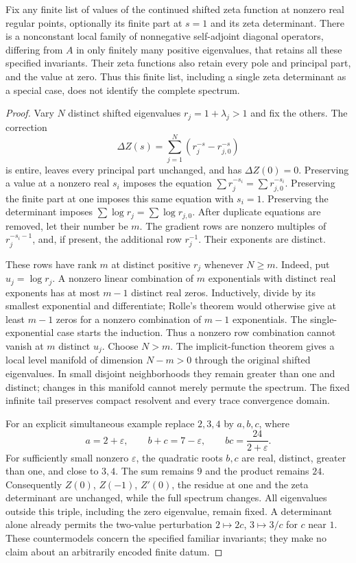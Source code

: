 \begin{theorem}
\label{final:O4-finite-countermodels}
Fix any finite list of values of the continued shifted zeta function
at nonzero real regular points, optionally its finite part at $s=1$
and its zeta determinant.  There is a nonconstant local family of
nonnegative self-adjoint diagonal operators, differing from $A$ in
only finitely many positive eigenvalues, that retains all these
specified invariants.  Their zeta functions also retain every pole
and principal part, and the value at zero.  Thus this finite list,
including a single zeta determinant as a special case, does not
identify the complete spectrum.
\end{theorem}

\begin{proof}
Vary $N$ distinct shifted eigenvalues $r_j=1+\lambda_j>1$ and fix
the others.  The correction
\[
 \Delta Z(s)=\sum_{j=1}^N(r_j^{-s}-r_{j,0}^{-s})
\]
is entire, leaves every principal part unchanged, and has
$\Delta Z(0)=0$.  Preserving a value at a nonzero real $s_i$ imposes
the equation $\sum r_j^{-s_i}=\sum r_{j,0}^{-s_i}$.
Preserving the finite part at one imposes this same equation with
$s_i=1$.  Preserving the determinant imposes
$\sum\log r_j=\sum\log r_{j,0}$.
After duplicate equations are removed, let their number be $m$.
The gradient rows are nonzero multiples of $r_j^{-s_i-1}$,
and, if present, the additional row $r_j^{-1}$.
Their exponents are distinct.

These rows have rank $m$ at distinct positive $r_j$ whenever $N\geq m$.
Indeed, put $u_j=\log r_j$.  A nonzero linear combination of $m$
exponentials with distinct real exponents has at most $m-1$ distinct
real zeros.  Inductively, divide by its smallest exponential and
differentiate; Rolle's theorem would otherwise give at least $m-1$
zeros for a nonzero combination of $m-1$ exponentials.  The
single-exponential case starts the induction.  Thus a nonzero row
combination cannot vanish at $m$ distinct $u_j$.
Choose $N>m$.  The implicit-function theorem gives a local level
manifold of dimension $N-m>0$ through the original shifted
eigenvalues.  In small disjoint neighborhoods they remain greater
than one and distinct; changes in this manifold cannot merely
permute the spectrum.  The fixed infinite tail preserves compact
resolvent and every trace convergence domain.

For an explicit simultaneous example replace $2,3,4$ by $a,b,c$,
where
\[
 a=2+\varepsilon,\qquad b+c=7-\varepsilon,
 \qquad bc=\frac{24}{2+\varepsilon}.
\]
For sufficiently small nonzero $\varepsilon$, the quadratic roots
$b,c$ are real, distinct, greater than one, and close to $3,4$.
The sum remains $9$ and the product remains $24$.
Consequently $Z(0)$, $Z(-1)$, $Z'(0)$, the residue at one and the
zeta determinant are unchanged, while the full spectrum changes.
All eigenvalues outside this triple, including the zero eigenvalue,
remain fixed.  A determinant alone already permits the two-value
perturbation $2\mapsto2c$, $3\mapsto3/c$ for $c$ near $1$.
These countermodels concern the specified familiar invariants;
they make no claim about an arbitrarily encoded finite datum.
\end{proof}

